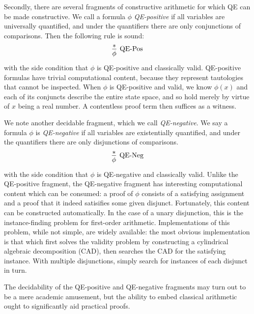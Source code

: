 \documentclass[12pt]{cmuthesis}
\theoremstyle{definition}
\theoremstyle{remark}
\begin{document}
Secondly, there are several fragments of constructive arithmetic for which QE can be made constructive.
We call a formula $\phi$ \emph{QE-positive} if all variables are universally quantified, and under the quantifiers there are only conjunctions of comparisons.
Then the following rule is sound:
\[\infer[\text{QE-Pos}]{\phi}{*}\] with the side condition that $\phi$ is  QE-positive and classically valid.
QE-positive formulas have trivial computational content, because they represent tautologies that cannot be inspected.
When $\phi$ is QE-positive and valid, we know $\phi(x)$ and each of its conjuncts describe the entire state space, and so hold merely by virtue of $x$ being a real number.
A contentless proof term then suffices as a witness.

We note another decidable fragment, which we call \emph{QE-negative}.
We say a formula $\phi$ is \emph{QE-negative} if all variables are existentially quantified, and under the quantifiers there are  only disjunctions of comparisons.
\[\infer[\text{QE-Neg}]{\phi}{*}\] with the side condition that $\phi$ is  QE-negative and classically valid.
Unlike the QE-positive fragment, the QE-negative fragment has interesting computational content which can be consumed: a proof of $\phi$ consists of a satisfying assignment and a proof that it indeed satisifies some given disjunct.
Fortunately, this content can be constructed automatically.
In the case of a unary disjunction, this is the instance-finding problem for first-order arithmetic.
Implementations of this problem, while not simple, are widely available: the most obvious implementation is that which first solves the validity problem by constructing a cylindrical algebraic decomposition (CAD), then searches the CAD for the satisfying instance.
With multiple disjunctions, simply search for instances of each disjunct in turn.

The decidability of the QE-positive and QE-negative fragments may turn out to be a mere academic amusement, but the ability to embed classical arithmetic ought to significantly aid practical proofs.
\end{document}

